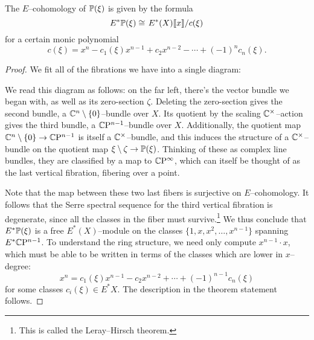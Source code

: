 \begin{theorem}\label{CohomologyOfProjectivization}
The $E$--cohomology of $\P(\xi)$ is given by the formula \[E^* \P(\xi) \cong \left. E^*(X) \llbracket x \rrbracket \middle/ c(\xi) \right.\] for a certain monic polynomial \[c(\xi) = x^n - c_1(\xi) x^{n-1} + c_2 x^{n-2} - \cdots + (-1)^n c_n(\xi).\]
\end{theorem}
\begin{proof}
We fit all of the fibrations we have into a single diagram:
\begin{center}
\end{center}
We read this diagram as follows: on the far left, there's the vector bundle we began with, as well as its zero-section $\zeta$.  Deleting the zero-section gives the second bundle, a $\C^n \setminus \{0\}$--bundle over $X$.  Its quotient by the scaling $\C^\times$--action gives the third bundle, a $\CP^{n-1}$--bundle over $X$.  Additionally, the quotient map $\C^n \setminus \{0\} \to \CP^{n-1}$ is itself a $\C^\times$--bundle, and this induces the structure of a $\C^\times$--bundle on the quotient map $\xi \setminus \zeta \to \P(\xi)$.  Thinking of these as complex line bundles, they are classified by a map to $\CP^\infty$, which can itself be thought of as the last vertical fibration, fibering over a point.

Note that the map between these two last fibers is surjective on $E$--cohomology.  It follows that the Serre spectral sequence for the third vertical fibration is degenerate, since all the classes in the fiber must survive.\footnote{This is called the Leray--Hirsch theorem.}  We thus conclude that $E^* \P(\xi)$ is a free $E^*(X)$--module on the classes $\{1, x, x^2, \ldots, x^{n-1}\}$ spanning $E^* \CP^{n-1}$.  To understand the ring structure, we need only compute $x^{n-1} \cdot x$, which must be able to be written in terms of the classes which are lower in $x$--degree: \[x^n = c_1(\xi) x^{n-1} - c_2 x^{n-2} + \cdots + (-1)^{n-1} c_n(\xi)\] for some classes $c_i(\xi) \in E^* X$.  The description in the theorem statement follows.
\end{proof}

